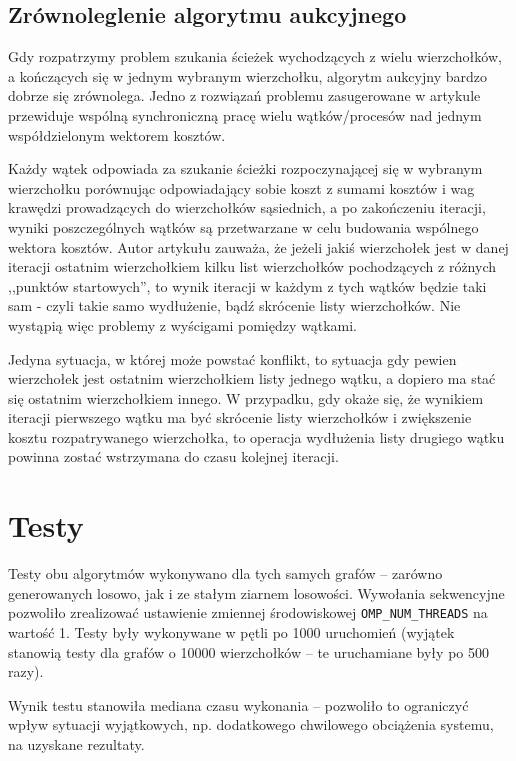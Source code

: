 \documentclass {article}
\begin{document}
\subsection{Zrównoleglenie algorytmu aukcyjnego}

Gdy rozpatrzymy problem szukania ścieżek wychodzących z wielu wierzchołków, a kończących się w jednym wybranym wierzchołku, algorytm aukcyjny bardzo dobrze się zrównolega. Jedno z rozwiązań problemu zasugerowane w artykule \cite{Bertsekas1991} przewiduje wspólną synchroniczną pracę wielu wątków/procesów nad jednym współdzielonym wektorem kosztów.

Każdy wątek odpowiada za szukanie ścieżki rozpoczynającej się w wybranym wierzchołku porównując odpowiadający sobie koszt z sumami kosztów i wag krawędzi prowadzących do wierzchołków sąsiednich, a po zakończeniu iteracji, wyniki poszczególnych wątków są przetwarzane w celu budowania wspólnego wektora kosztów. Autor artykułu zauważa, że jeżeli jakiś wierzchołek jest w danej iteracji ostatnim wierzchołkiem kilku list wierzchołków pochodzących z różnych ,,punktów startowych'', to wynik iteracji w każdym z tych wątków będzie taki sam - czyli takie samo wydłużenie, bądź skrócenie listy wierzchołków. Nie wystąpią więc problemy z wyścigami pomiędzy wątkami.

Jedyna sytuacja, w której może powstać konflikt, to sytuacja gdy pewien wierzchołek jest ostatnim wierzchołkiem listy jednego wątku, a dopiero ma stać się ostatnim wierzchołkiem innego. W przypadku, gdy okaże się, że wynikiem iteracji pierwszego wątku ma być skrócenie listy wierzchołków i zwiększenie kosztu rozpatrywanego wierzchołka, to operacja wydłużenia listy drugiego wątku powinna zostać wstrzymana do czasu kolejnej iteracji.

\section{Testy}

Testy obu algorytmów wykonywano dla tych samych grafów -- zarówno generowanych losowo, jak i ze stałym ziarnem losowości. Wywołania sekwencyjne pozwoliło zrealizować ustawienie zmiennej środowiskowej \verb|OMP_NUM_THREADS| na wartość 1. Testy były wykonywane w pętli po 1000 uruchomień (wyjątek stanowią testy dla grafów o 10000 wierzchołków -- te uruchamiane były po 500 razy).

Wynik testu stanowiła mediana czasu wykonania -- pozwoliło to ograniczyć wpływ sytuacji wyjątkowych, np. dodatkowego chwilowego obciążenia systemu, na uzyskane rezultaty.
\end{document}
